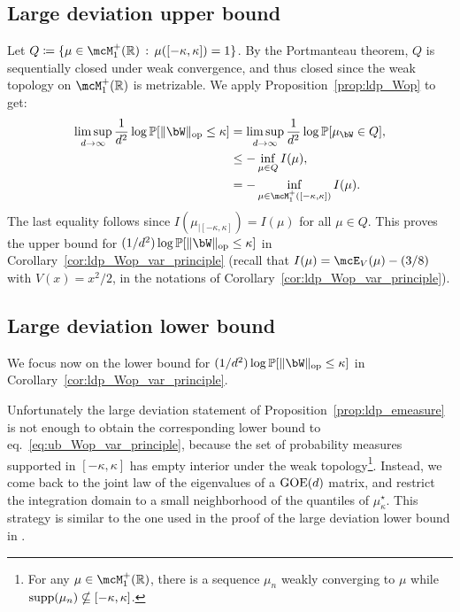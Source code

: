 \subsection{Large deviation upper bound}\label{subsec:ldp_Wop_ub}


\myskip
Let $Q \coloneqq \{\mu \in \mcM_1^+(\bbR) \, : \, \mu([-\kappa, \kappa]) = 1\}$. 
By the Portmanteau theorem, $Q$ is sequentially closed under weak convergence, and thus closed since the weak topology on $\mcM_1^+(\bbR)$ is metrizable.
We apply Proposition~\ref{prop:ldp_Wop} to get:
\begin{align}
    \label{eq:ub_Wop_var_principle}
    \nonumber
     \limsup_{d \to \infty} \frac{1}{d^2} \log \bbP[\|\bW\|_\op \leq \kappa] &=  \limsup_{d \to \infty} \frac{1}{d^2} \log \bbP[\mu_\bW \in Q] , \\ 
    \nonumber
     &\leq - \inf_{\mu \in Q} I(\mu), \\ 
     &= - \inf_{\mu \in \mcM_1^+([-\kappa,\kappa])} I(\mu).
\end{align}
The last equality follows since $I(\mu_{|[-\kappa,\kappa]}) = I(\mu)$ for all $\mu \in Q$.
This proves the upper bound for $(1/d^2) \log \bbP[\|\bW\|_\op \leq \kappa]$ in Corollary~\ref{cor:ldp_Wop_var_principle} (recall that $I(\mu) = \mcE_V(\mu) - (3/8)$ with $V(x) = x^2/2$, 
in the notations of Corollary~\ref{cor:ldp_Wop_var_principle}).

\subsection{Large deviation lower bound}

We focus now on the lower bound for $(1/d^2) \log \bbP[\|\bW\|_\op \leq \kappa]$ in Corollary~\ref{cor:ldp_Wop_var_principle}.

\myskip
Unfortunately the large deviation statement of Proposition~\ref{prop:ldp_emeasure} is not enough to obtain the corresponding lower bound to eq.~\eqref{eq:ub_Wop_var_principle}, 
because the set of probability measures supported in $[-\kappa,\kappa]$ has empty interior under the weak topology\footnote{For any $\mu \in \mcM_1^+(\bbR)$, there is a sequence $\mu_n$ weakly converging to $\mu$ while $ \operatorname*{supp}(\mu_n) \nsubseteq [-\kappa,\kappa]$.}. 
Instead, we come back to the joint law of the eigenvalues of a $\mathrm{GOE}(d)$ matrix, and 
restrict the integration domain to a small neighborhood of the quantiles of $\mu_\kappa^\star$.
This strategy is similar to the one used in the proof of the large deviation lower bound in \cite{arous1997large}.

